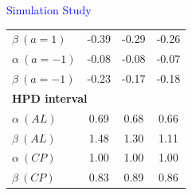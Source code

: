 \documentclass[final]{beamer}
\newlength{\colwidth}
\begin{document}
\begin{frame}[t]
\begin{columns}[t]
\begin{column}{\colwidth}
\begin{block}{\textcolor{blue}{Simulation Study}}
{\begin{table}[h!]
\begin{tabular}{lccc}
        $\beta \ (a=1)$        & -0.39         & -0.29         & -0.26         \\
        $\alpha \ (a=-1)$      & -0.08         & -0.08         & -0.07         \\
        $\beta \ (a=-1)$       & -0.23         & -0.17         & -0.18         \\
        \midrule
        \multicolumn{4}{l}{\textbf{HPD interval}} \\
        $\alpha \ (AL)$        & 0.69          & 0.68          & 0.66          \\
        $\beta \ (AL)$         & 1.48          & 1.30          & 1.11          \\
        $\alpha \ (CP)$        & 1.00          & 1.00          & 1.00          \\
        $\beta \ (CP)$         & 0.83          & 0.89          & 0.86          \\
        \bottomrule
    \end{tabular}
\end{table}
}


\end{block}
\end{column}
\end{columns}
\end{frame}
\end{document}
